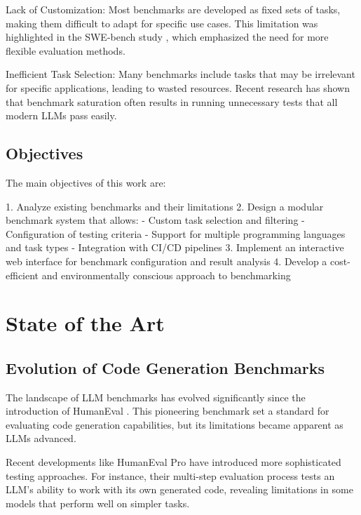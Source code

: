 Lack of Customization: Most benchmarks are developed as fixed sets of tasks, making them difficult to adapt for specific use cases. This limitation was highlighted in the SWE-bench study \cite{jimenez2024swebenchlanguagemodelsresolve}, which emphasized the need for more flexible evaluation methods.

Inefficient Task Selection: Many benchmarks include tasks that may be irrelevant for specific applications, leading to wasted resources. Recent research \cite{vendrow2025largelanguagemodelbenchmarks} has shown that benchmark saturation often results in running unnecessary tests that all modern LLMs pass easily.

\section{Objectives}

The main objectives of this work are:

1. Analyze existing benchmarks and their limitations
2. Design a modular benchmark system that allows:
   - Custom task selection and filtering
   - Configuration of testing criteria
   - Support for multiple programming languages and task types
   - Integration with CI/CD pipelines
3. Implement an interactive web interface for benchmark configuration and result analysis
4. Develop a cost-efficient and environmentally conscious approach to benchmarking

\chapter{State of the Art}

\section{Evolution of Code Generation Benchmarks}

The landscape of LLM benchmarks has evolved significantly since the introduction of HumanEval \cite{chen2021evaluatinglargelanguagemodels}. This pioneering benchmark set a standard for evaluating code generation capabilities, but its limitations became apparent as LLMs advanced.

Recent developments like HumanEval Pro \cite{yu2024humanevalprombpppro} have introduced more sophisticated testing approaches. For instance, their multi-step evaluation process tests an LLM's ability to work with its own generated code, revealing limitations in some models that perform well on simpler tasks.


